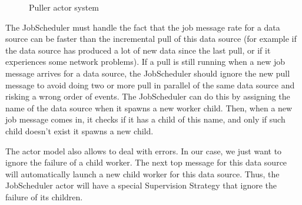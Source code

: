 \begin{figure}[h]
  \begin{center} 
    \caption{Puller actor system}
    \label{fig:archi_actor_dataintegration}
  \end{center}
\end{figure}

The JobScheduler must handle the fact that the job message rate for a data source can be faster than the incremental pull
of this data source (for example if the data source has produced a lot of new data since the last pull, or if it experiences some network problems). If a pull is still running when 
a new job message arrives for a data source, the JobScheduler should ignore the new pull message to avoid doing two or more pull in parallel of the same data source and risking a wrong
order of events. The JobScheduler can do this by assigning the name of the data source when it spawns a new worker child. Then, when a new job message comes in, it checks if it has a child of this name, and only if such child doesn't exist it spawns a new child.

The actor model also allows to deal with errors. In our case, we just want to ignore the failure of a child worker. The next top message for this data source will automatically
launch a new child worker for this data source. Thus, the JobScheduler actor will have a special Supervision Strategy that ignore the failure of its children.


